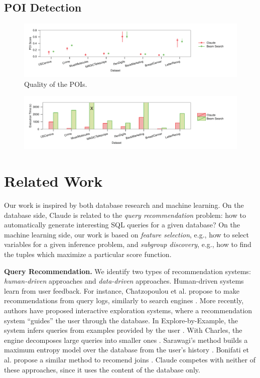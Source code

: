 \subsection{POI Detection}

\begin{figure}[t!]
\centering
\includegraphics[width=2\columnwidth]{plots/POI-score}
\caption{Quality of the POIs.}
\label{pic:POI-quali}
\end{figure}

\begin{figure}[t!]
\centering
\includegraphics[width=2\columnwidth]{plots/POI-timing}
\caption{}
\label{pic:POI-time}
\end{figure}

\section{Related Work}
Our work is inspired by both database research and machine learning. On the
database side, Claude is related to the \emph{query recommendation} problem:
how to automatically generate interesting SQL queries for a given database? On
the machine learning side, our work is based on \emph{feature selection}, e.g.,
how to select variables for a given inference problem, and \emph{subgroup
discovery}, e.g., how to find the tuples which maximize a particular score
function.

\textbf{Query Recommendation.} We identify two types of recommendation systems:
\emph{human-driven} approaches and \emph{data-driven} approaches. Human-driven
systems learn from user feedback. For instance, Chatzopoulou et al. propose to
make recommendations from query logs, similarly to search engines
\cite{chatzopoulou2009query}. More recently, authors have proposed interactive
exploration systems, where a recommendation system ``guides'' the user through
the database. In Explore-by-Example, the system infers queries from examples
provided by the user \cite{dimitriadou2014explore}. With Charles, the engine
decomposes large queries into smaller ones \cite{sellam2013meet}. Sarawagi's
method builds a maximum entropy model over the database from the user's history 
\cite{sarawagi2000user}. Bonifati et al. propose a similar method to recomend
joins \cite{bonifati2014interactive}.  Claude competes with neither of these
approaches, since it uses the content of the database only.

